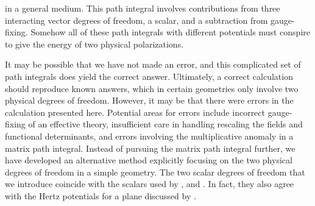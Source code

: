 in a general medium.  
This path integral involves contributions from three interacting vector degrees of freedom, a scalar, and a subtraction from
gauge-fixing.  Somehow all of these path integrals with different potentials must conspire 
to give the energy of two physical polarizations.  

It may be possible that we have not made an error, and this complicated set of path integrals does yield the correct answer.
Ultimately, a correct calculation should reproduce known answers, which in certain geometries only involve two physical degrees of freedom.
However, it may be that there were errors in the calculation presented here.
Potential areas for errors include incorrect gauge-fixing of an effective theory, insufficient care in handling rescaling the fields and functional determinants,
 and errors involving the multiplicative anomaly in a matrix path integral.  
Instead of pursuing the matrix path integral further, we have developed an 
alternative method explicitly focusing on the two physical degrees of freedom in a simple geometry.
The two scalar degrees of freedom that we introduce coincide with the scalars used by \citet{Schwinger1992},
and \citet{Bordag1999}.  In fact, they also agree with the Hertz potentials for a plane discussed by \citet{Nisbet1955,Nisbet1957}.

